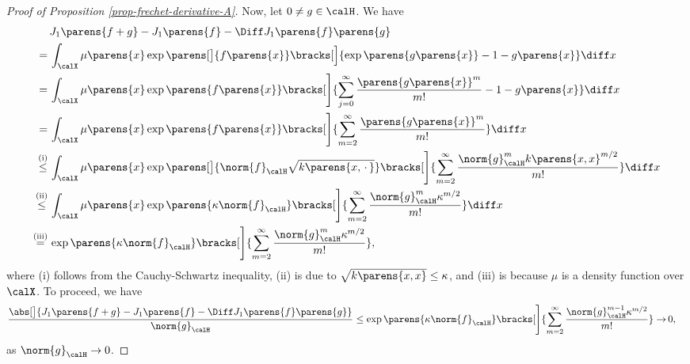 \documentclass[12pt]{article}
\theoremstyle{definition}
\theoremstyle{theorem}
\theoremstyle{remark}
\begin{document}
\begin{proof}[Proof of Proposition \ref{prop-frechet-derivative-A}]
	Now, let $0 \ne g \in \calH$. We have 
	\begin{align*}
		  & \, J_1 \parens{f + g} - J_1 \parens{f} - \Diff J_1 \parens{f} \parens{g} \\ 
		=  & \, \int_{\calX} \mu \parens{x} \exp \parens[\big]{ f \parens{x} } \bracks[\Big]{\exp \parens{ g \parens{x} } - 1 - g \parens{x} } \diff x \\ 
		= & \, \int_{\calX} \mu \parens{x} \exp \parens{ f \parens{x} } \bracks[\Bigg]{\sum_{j=0}^\infty \frac{\parens{ g \parens{x} }^m}{m!} - 1 - g \parens{x}} \diff x \\
		= & \, \int_{\calX} \mu \parens{x} \exp \parens{ f \parens{x} } \bracks[\Bigg]{ \sum_{m=2}^\infty \frac{\parens{ g \parens{x} }^m}{m!}} \diff x \\
		\stackrel{\text{(i)}}{\le} & \, \int_{\calX} \mu \parens{x} \exp \parens[\big]{ \norm{f}_{\calH} \sqrt{k \parens{x, \,\cdot\,}} } \bracks[\Bigg]{ \sum_{m=2}^\infty \frac{\norm{g}_{\calH}^m k \parens{x, x}^{m/2}}{m!}} \diff x \\ 
		\stackrel{\text{(ii)}}{\le} & \, \int_{\calX} \mu \parens{x} \exp \parens{ \kappa \norm{f}_{\calH} } \bracks[\Bigg]{ \sum_{m=2}^\infty \frac{\norm{g}_{\calH}^m \kappa^{m/2}}{m!}} \diff x \\ 
		\stackrel{\text{(iii)}}{=} & \, \exp \parens{ \kappa \norm{f}_{\calH} } \bracks[\Bigg]{ \sum_{m=2}^\infty \frac{\norm{g}_{\calH}^m \kappa^{m/2}}{m!}}, 
	\end{align*}
	where (i) follows from the Cauchy-Schwartz inequality, (ii) is due to $\sqrt{k \parens{x, x}} \le \kappa$, and (iii) is because $\mu$ is a density function over $\calX$. To proceed, we have 
	\begin{align*}
		\frac{\abs[\big]{J_1 \parens{f + g} - J_1 \parens{f} - \Diff J_1 \parens{f} \parens{g}}}{\norm{g}_{\calH}} 
		\le \exp \parens{ \kappa \norm{f}_{\calH} } \bracks[\Bigg]{ \sum_{m=2}^\infty \frac{\norm{g}_{\calH}^{m-1} \kappa^{m/2}}{m!}} 
		\to & \, 0, 
	\end{align*}
	as $\norm{g}_{\calH} \to 0$. 
	

\end{proof}
\end{document}
